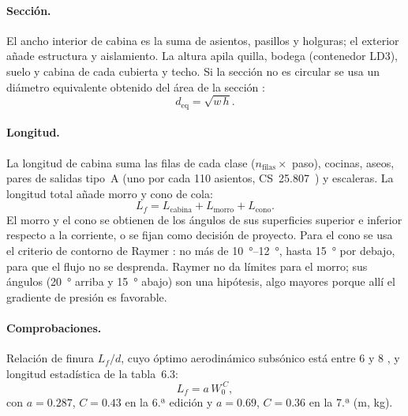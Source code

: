 \documentclass[11pt,a4paper]{article}
\newcommand{\WO}{W_0}
\begin{document}
\paragraph{Sección.} El ancho interior de cabina es la suma de asientos,
pasillos y holguras; el exterior añade estructura y aislamiento. La altura
apila quilla, bodega (contenedor LD3), suelo y cabina de cada cubierta y
techo. Si la sección no es circular se usa un diámetro equivalente obtenido
del área de la sección \cite[cap.~6]{raymer6}:
\begin{equation}
  d_\text{eq} = \sqrt{w\,h} .
\end{equation}

\paragraph{Longitud.} La longitud de cabina suma las filas de cada clase
($n_\text{filas}\times$ paso), cocinas, aseos, pares de salidas tipo~A
(uno por cada 110 asientos, CS~25.807~\cite{cs25}) y escaleras. La longitud
total añade morro y cono de cola:
\begin{equation}
  L_f = L_\text{cabina} + L_\text{morro} + L_\text{cono}.
\end{equation}
El morro y el cono se obtienen de los ángulos de sus superficies superior e
inferior respecto a la corriente, o se fijan como decisión de proyecto. Para
el cono se usa el criterio de contorno de Raymer \cite[fig.~8.2]{raymer6}: no
más de \SIrange{10}{12}{\degree}, hasta \SI{15}{\degree} por debajo, para que
el flujo no se desprenda. Raymer no da límites para el morro; sus ángulos
(\SI{20}{\degree} arriba y \SI{15}{\degree} abajo) son una hipótesis, algo
mayores porque allí el gradiente de presión es favorable.

\paragraph{Comprobaciones.} Relación de finura $L_f/d$, cuyo óptimo
aerodinámico subsónico está entre 6 y 8 \cite[cap.~6]{raymer6}, y longitud
estadística de la tabla~6.3:
\begin{equation}
  L_f = a\,\WO^{\,C},
\end{equation}
con $a=\num{0.287}$, $C=\num{0.43}$ en la 6.ª edición y $a=\num{0.69}$,
$C=\num{0.36}$ en la 7.ª (\si{m}, \si{kg}).
\end{document}
